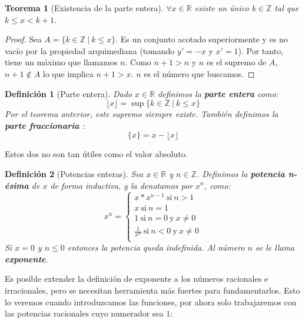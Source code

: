 \documentclass{article}
\newtheorem{theorem}{Teorema}
\newtheorem{define}{Definición}
\begin{document}
\begin{theorem}[Existencia de la parte entera]
	$\forall x \in \mathbb{R}$ existe un único $k \in \mathbb{Z}$ tal que $k\leq x < k+1$.
\end{theorem}
\begin{proof}
	Sea $A = \{ k \in \mathbb{Z}\ |\ k \leq x\}$. Es un conjunto acotado superiormente y es no vacío por la propiedad arquimediana (tomando $y' = -x$  y $x' = 1$). Por tanto, tiene un máximo que llamamos $n$. Como $n+1 > n$ y $n$ es el supremo de $A$, $n+1 \not \in A$ lo que implica $n+1 > x$. $n$ es el número que buscamos.
\end{proof}

\begin{define}[Parte entera]
Dado $x \in \mathbb{R}$ definimos la \textbf{parte entera} como:
\begin{equation}
\lfloor x \rfloor = \sup \{k\in \mathbb{Z}\ |\ k\leq x\}
\end{equation}
Por el teorema anterior, este supremo siempre existe. También definimos la \textbf{parte fraccionaria} :
\begin{equation}
\{x\} = x - \lfloor x \rfloor
\end{equation}
\end{define}
Estos dos no son tan útiles como el valor absoluto.

\begin{define}[Potencias enteras]
Sea $x\in \mathbb{R}$ y $n\in \mathbb{Z}$. Definimos la \textbf{potencia n-ésima} de $x$ de forma inductiva, y la denotamos por $x^n$, como:
\begin{equation}
x^n = \left\lbrace
\begin{array}{l}
x * x^{n-1}\ \text{si}\ n > 1 \\
x\ \text{si}\ n = 1 \\
1\ \text{si}\ n = 0\ \text{y}\ x \neq 0 \\
\frac{1}{x^n}\ \text{si}\ n < 0\ \text{y}\ x \neq 0 \\
\end{array}
\right.
\end{equation}
Si $x = 0$ y $n \leq 0$ entonces la potencia queda indefinida. Al número $n$ se le llama \textbf{exponente}.
\end{define}

Es posible extender la definición de exponente a los números racionales e irracionales, pero se necesitan herramienta más fuertes para fundamentarlos. Esto lo veremos cuando introduzcamos las funciones, por ahora solo trabajaremos con las potencias racionales cuyo numerador sea $1$:
\end{document}
